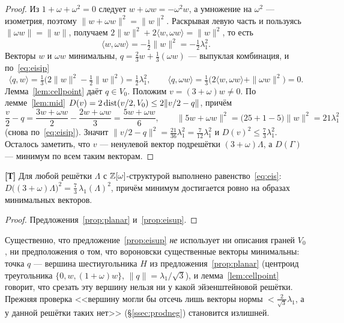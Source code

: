 \begin{proof}
Из $1+\omega+\omega^2=0$ следует $w+\omega w=-\omega^2w$, а умножение на
$\omega^2$ --- изометрия, поэтому $\|w+\omega w\|^2=\|w\|^2$. Раскрывая левую
часть и пользуясь $\|\omega w\|=\|w\|$, получаем
$2\|w\|^2+2\langle w,\omega w\rangle=\|w\|^2$, то есть
\begin{equation}\label{eq:eisip}
\langle w,\omega w\rangle=-\tfrac12\|w\|^2=-\tfrac12\lambda_1^2 .
\end{equation}
Векторы $w$ и $\omega w$ минимальны, $q=\frac23w+\frac13(\omega w)$ ---
выпуклая комбинация, и по~\eqref{eq:eisip}
\[
\langle q,w\rangle=\tfrac13\bigl(2\|w\|^2-\tfrac12\|w\|^2\bigr)=\tfrac12\lambda_1^2,
\qquad
\langle q,\omega w\rangle=\tfrac13\bigl(2\langle w,\omega w\rangle+\|\omega w\|^2\bigr)=0 .
\]
Лемма~\ref{lem:cellpoint} даёт $q\in V_0$. Положим $v=(3+\omega)w\ne0$. По
лемме~\ref{lem:mid} $D(v)=2\operatorname{dist}(v/2,V_0)\le2\|v/2-q\|$, причём
\[
\frac v2-q=\frac{3w+\omega w}2-\frac{2w+\omega w}3=\frac{5w+\omega w}6,
\qquad
\|5w+\omega w\|^2=\bigl(25+1-5\bigr)\|w\|^2=21\lambda_1^2
\]
(снова по~\eqref{eq:eisip}). Значит $\|v/2-q\|^2=\frac{21}{36}\lambda_1^2
=\frac7{12}\lambda_1^2$ и $D(v)^2\le\frac73\lambda_1^2$. Осталось заметить, что
$v$ --- ненулевой вектор подрешётки $(3+\omega)\Lambda$, а $D(\Gamma)$ ---
минимум по всем таким векторам.
\end{proof}

\begin{theorem}\label{thm:eis}
\textbf{[Т]} Для любой решётки $\Lambda$ с $\mathbb{Z}[\omega]$-структурой выполнено
равенство~\eqref{eq:eis}:
$D\bigl((3+\omega)\Lambda\bigr)^2=\frac73\,\lambda_1(\Lambda)^2$, причём минимум
достигается ровно на образах минимальных векторов.
\end{theorem}

\begin{proof}
Предложения~\ref{prop:planar} и~\ref{prop:eisup}.
\end{proof}

Существенно, что предложение~\ref{prop:eisup} \emph{не} использует ни описания
граней $V_0$, ни предположения о том, что вороновски существенные векторы
минимальны: точка $q$ --- вершина шестиугольника $H$ из
предложения~\ref{prop:planar} (центроид треугольника $\{0,w,(1+\omega)w\}$,
$\|q\|=\lambda_1/\sqrt3$), и лемма~\ref{lem:cellpoint} говорит, что срезать эту
вершину нельзя ни у какой эйзенштейновой решётки. Прежняя проверка
<<вершину могли бы отсечь лишь векторы нормы $<\frac2{\sqrt3}\lambda_1$, а у
данной решётки таких нет>> (\S\ref{ssec:prodneg}) становится излишней.

